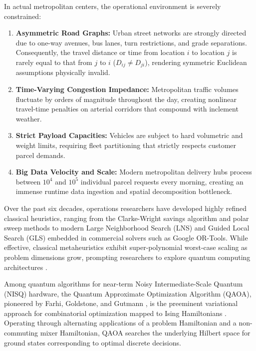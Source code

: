 \documentclass[journal,10pt]{IEEEtran}
\begin{document}
In actual metropolitan centers, the operational environment is severely constrained:
\begin{enumerate}
    \item \textbf{Asymmetric Road Graphs:} Urban street networks are strongly directed due to one-way avenues, bus lanes, turn restrictions, and grade separations. Consequently, the travel distance or time from location $i$ to location $j$ is rarely equal to that from $j$ to $i$ ($D_{ij} \ne D_{ji}$), rendering symmetric Euclidean assumptions physically invalid.
    \item \textbf{Time-Varying Congestion Impedance:} Metropolitan traffic volumes fluctuate by orders of magnitude throughout the day, creating nonlinear travel-time penalties on arterial corridors that compound with inclement weather.
    \item \textbf{Strict Payload Capacities:} Vehicles are subject to hard volumetric and weight limits, requiring fleet partitioning that strictly respects customer parcel demands.
    \item \textbf{Big Data Velocity and Scale:} Modern metropolitan delivery hubs process between $10^4$ and $10^5$ individual parcel requests every morning, creating an immense runtime data ingestion and spatial decomposition bottleneck.
\end{enumerate}

Over the past six decades, operations researchers have developed highly refined classical heuristics, ranging from the Clarke-Wright savings algorithm \cite{clarke1964scheduling} and polar sweep methods \cite{gillett1974sweep} to modern Large Neighborhood Search (LNS) and Guided Local Search (GLS) \cite{voudouris1999guided, toth2014vehicle} embedded in commercial solvers such as Google OR-Tools. While effective, classical metaheuristics exhibit super-polynomial worst-case scaling as problem dimensions grow, prompting researchers to explore quantum computing architectures \cite{preskill2018quantum}.

Among quantum algorithms for near-term Noisy Intermediate-Scale Quantum (NISQ) hardware, the Quantum Approximate Optimization Algorithm (QAOA), pioneered by Farhi, Goldstone, and Gutmann \cite{farhi2014qaoa}, is the preeminent variational approach for combinatorial optimization mapped to Ising Hamiltonians \cite{lucas2014ising}. Operating through alternating applications of a problem Hamiltonian and a non-commuting mixer Hamiltonian, QAOA searches the underlying Hilbert space for ground states corresponding to optimal discrete decisions.
\end{document}
